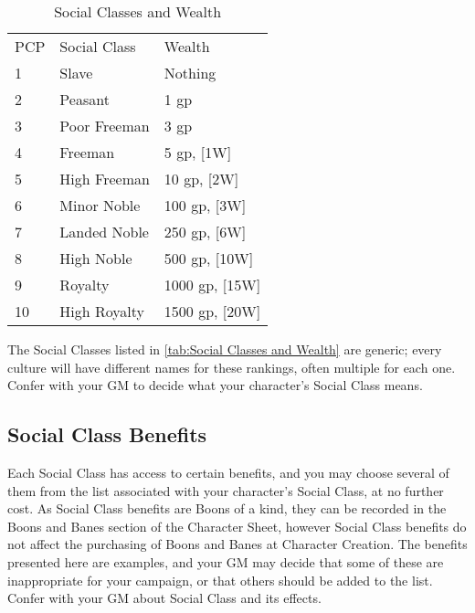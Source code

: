 \documentclass[oneside,11pt,english]{book}
\begin{document}
\setlength{\intextsep}{0pt}
\begin{wraptable}{r}{7.5cm}
  \centering
  \begin{tabu} spread 0pt {X[-1,c]XX}
    PCP		&Social Class	&Wealth\\
    1		&Slave			&Nothing\\
    2		&Peasant		&1 gp\\
    3		&Poor Freeman	&3 gp\\
    4		&Freeman		&5 gp, [1W]\\
    5		&High Freeman	&10 gp, [2W]\\
    6		&Minor Noble	&100 gp, [3W]\\
    7		&Landed Noble	&250 gp, [6W]\\
    8		&High Noble		&500 gp, [10W]\\
    9		&Royalty		&1000 gp, [15W]\\
    10		&High Royalty	&1500 gp, [20W]\\
  \end{tabu}
  \caption{Social Classes and Wealth}\vspace{-10pt}
  \label{tab:Social Classes and Wealth}
\end{wraptable}
\setlength{\intextsep}{\oldintextsep}

The Social Classes listed in \autoref{tab:Social Classes and Wealth} are
generic; every culture will have different names for these rankings, often
multiple for each one. Confer with your GM to decide what your character’s
Social Class means. 

\subsection{Social Class Benefits} Each Social Class has access to certain
benefits, and you may choose several of them from the list associated with your
character’s Social Class, at no further cost. As Social Class benefits are Boons
of a kind, they can be recorded in the Boons and Banes section of the Character
Sheet, however Social Class benefits do not affect the purchasing of Boons and
Banes at Character Creation. 
The benefits presented here are examples, and your GM may decide that some of
these are inappropriate for your campaign, or that others should be added to the
list. Confer with your GM about Social Class and its effects. 
\end{document}
